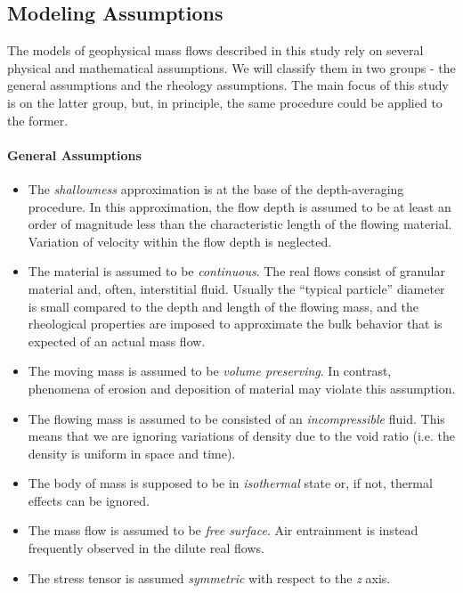 \documentclass{article}
\begin{document}
\subsection{Modeling Assumptions}\label{subsec:ModelAssump}
The models of geophysical mass flows described in this study rely on several physical and mathematical assumptions. We will classify them in two groups - the general assumptions and the rheology assumptions. The main focus of this study is on the latter group, but, in principle, the same procedure could be applied to the former.

\paragraph{General Assumptions}
\begin{itemize}
\item The \textit{shallowness} approximation is at the base of the depth-averaging procedure. In this approximation, the flow depth is assumed to be at least an order of magnitude less than the characteristic length of the flowing material. Variation of velocity within the flow depth is neglected.

\item The material is assumed to be \textit{continuous}. The real flows consist of granular material and, often, interstitial fluid. Usually the ``typical particle'' diameter is small compared to the depth and length of the flowing mass, and the rheological properties are imposed to approximate the bulk behavior that is expected of an actual mass flow.

\item The moving mass is assumed to be \textit{volume preserving}. In contrast, phenomena of erosion and deposition of material may violate this assumption.

\item The flowing mass is assumed to be consisted of an \textit{incompressible} fluid. This means that we are ignoring variations of density due to the void ratio (i.e. the density is uniform in space and time).

\item The body of mass is supposed to be in \textit{isothermal} state or, if not, thermal effects can be ignored.

\item The mass flow is assumed to be \textit{free surface}. Air entrainment is instead frequently observed in the dilute real flows.

\item The stress tensor is assumed \textit{symmetric} with respect to the \textit{z} axis.
\end{itemize}
\end{document}

